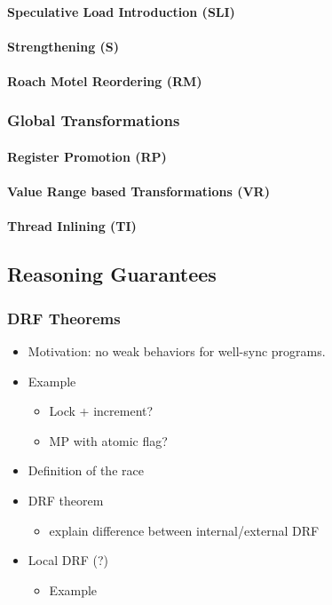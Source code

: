 \paragraph{Speculative Load Introduction (SLI)}

\paragraph{Strengthening (S)}

\paragraph{Roach Motel Reordering (RM)}

\subsubsection{Global Transformations}

\paragraph{Register Promotion (RP)}

\paragraph{Value Range based Transformations (VR)}

\paragraph{Thread Inlining (TI)}

\subsection{Reasoning Guarantees}

\subsubsection{DRF Theorems}
\label{sec:background:drf}

\begin{itemize}
  \item Motivation: no weak behaviors for well-sync programs.
  \item Example
  \begin{itemize}
    \item Lock + increment?
    \item MP with atomic flag?
  \end{itemize}
  \item Definition of the race
  \item DRF theorem
  \begin{itemize}
    \item explain difference between internal/external DRF
  \end{itemize}
  \item Local DRF (?)
  \begin{itemize}
    \item Example
  \end{itemize}
\end{itemize}

